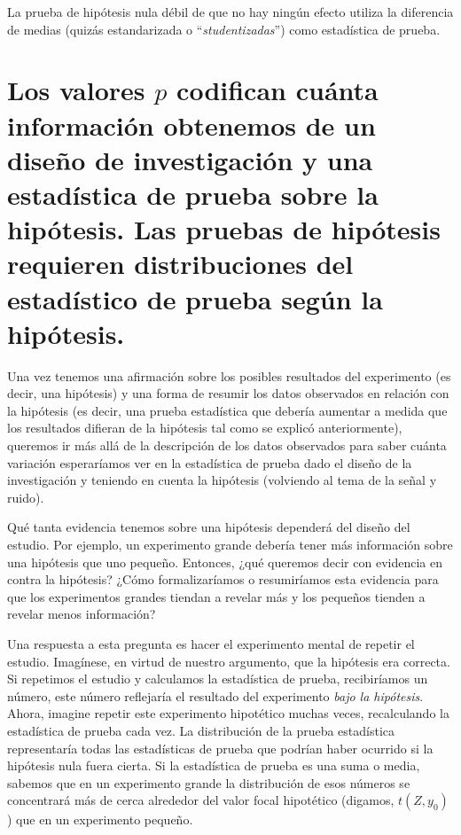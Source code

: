 \documentclass[
]{article}
\begin{document}
La prueba de hipótesis nula débil de que no hay ningún efecto utiliza la diferencia de medias (quizás estandarizada o ``\emph{studentizadas}'') como estadística de prueba.

\hypertarget{los-valores-p-codifican-cuuxe1nta-informaciuxf3n-obtenemos-de-un-diseuxf1o-de-investigaciuxf3n-y-una-estaduxedstica-de-prueba-sobre-la-hipuxf3tesis.-las-pruebas-de-hipuxf3tesis-requieren-distribuciones-del-estaduxedstico-de-prueba-seguxfan-la-hipuxf3tesis.}{%
\section{\texorpdfstring{Los valores \(p\) codifican cuánta información obtenemos de un diseño de investigación y una estadística de prueba sobre la hipótesis. Las pruebas de hipótesis requieren distribuciones del estadístico de prueba según la hipótesis.}{Los valores p codifican cuánta información obtenemos de un diseño de investigación y una estadística de prueba sobre la hipótesis. Las pruebas de hipótesis requieren distribuciones del estadístico de prueba según la hipótesis.}}\label{los-valores-p-codifican-cuuxe1nta-informaciuxf3n-obtenemos-de-un-diseuxf1o-de-investigaciuxf3n-y-una-estaduxedstica-de-prueba-sobre-la-hipuxf3tesis.-las-pruebas-de-hipuxf3tesis-requieren-distribuciones-del-estaduxedstico-de-prueba-seguxfan-la-hipuxf3tesis.}}

Una vez tenemos una afirmación sobre los posibles resultados del experimento (es decir, una hipótesis) y una forma de resumir los datos observados en relación con la hipótesis (es decir, una prueba estadística que debería aumentar a medida que los resultados difieran de la hipótesis tal como se explicó anteriormente), queremos ir más allá de la descripción de los datos observados para saber cuánta variación esperaríamos ver en la estadística de prueba dado el diseño de la investigación y teniendo en cuenta la hipótesis (volviendo al tema de la señal y ruido).

Qué tanta evidencia tenemos sobre una hipótesis dependerá del diseño del estudio. Por ejemplo, un experimento grande debería tener más información sobre
una hipótesis que uno pequeño. Entonces, ¿qué queremos decir con evidencia en contra la hipótesis? ¿Cómo formalizaríamos o resumiríamos esta evidencia para que
los experimentos grandes tiendan a revelar más y los pequeños tienden a revelar menos información?

Una respuesta a esta pregunta es hacer el experimento mental de repetir
el estudio. Imagínese, en virtud de nuestro argumento, que la hipótesis era correcta. Si repetimos el estudio y calculamos la estadística de prueba, recibiríamos un número, este número reflejaría el resultado del experimento \emph{bajo la hipótesis}. Ahora, imagine repetir este experimento hipotético muchas veces,
recalculando la estadística de prueba cada vez. La distribución de la prueba
estadística representaría todas las estadísticas de prueba que podrían haber ocurrido si la hipótesis nula fuera cierta. Si la estadística de prueba es una suma o media, sabemos que en un experimento grande la distribución de esos números
se concentrará más de cerca alrededor del valor focal hipotético (digamos,
\(t(Z, y_0)\)) que en un experimento pequeño.
\end{document}
